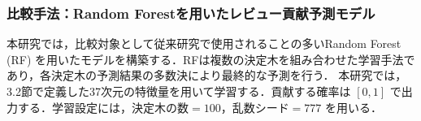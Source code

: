 \documentclass[submit,noauthor,ses,dvipdfmx]{ipsj}
\newcommand{\todo}[1]{\colorbox{yellow}{{\bf TODO}:}{\color{red} {\textbf{[#1]}}}}
\begin{document}









\subsubsection{比較手法：Random Forestを用いたレビュー貢献予測モデル}\label{sec:rf}
本研究では，比較対象として従来研究で使用されることの多いRandom Forest (RF) を用いたモデルを構築する．RFは複数の決定木を組み合わせた学習手法であり，各決定木の予測結果の多数決により最終的な予測を行う．
本研究では，3.2節で定義した37次元の特徴量を用いて学習する\cite{breiman_rf}．貢献する確率は $[0, 1]$ で出力する．学習設定には，決定木の数$= 100$，乱数シード$=777$ を用いる．
\end{document}

